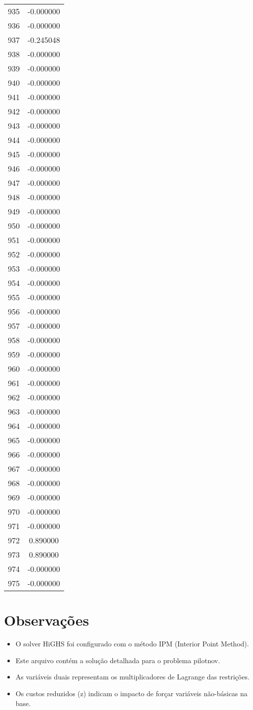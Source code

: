 \documentclass[12pt]{article}
\begin{document}
\begin{longtable}{@{}cc@{}}
935 & -0.000000 \\
936 & -0.000000 \\
937 & -0.245048 \\
938 & -0.000000 \\
939 & -0.000000 \\
940 & -0.000000 \\
941 & -0.000000 \\
942 & -0.000000 \\
943 & -0.000000 \\
944 & -0.000000 \\
945 & -0.000000 \\
946 & -0.000000 \\
947 & -0.000000 \\
948 & -0.000000 \\
949 & -0.000000 \\
950 & -0.000000 \\
951 & -0.000000 \\
952 & -0.000000 \\
953 & -0.000000 \\
954 & -0.000000 \\
955 & -0.000000 \\
956 & -0.000000 \\
957 & -0.000000 \\
958 & -0.000000 \\
959 & -0.000000 \\
960 & -0.000000 \\
961 & -0.000000 \\
962 & -0.000000 \\
963 & -0.000000 \\
964 & -0.000000 \\
965 & -0.000000 \\
966 & -0.000000 \\
967 & -0.000000 \\
968 & -0.000000 \\
969 & -0.000000 \\
970 & -0.000000 \\
971 & -0.000000 \\
972 & 0.890000 \\
973 & 0.890000 \\
974 & -0.000000 \\
975 & -0.000000 \\

\end{longtable}


\section{Observações}

\begin{itemize}
\item O solver HiGHS foi configurado com o método IPM (Interior Point Method).
\item Este arquivo contém a solução detalhada para o problema pilotnov.
\item As variáveis duais representam os multiplicadores de Lagrange das restrições.
\item Os custos reduzidos (z) indicam o impacto de forçar variáveis não-básicas na base.
\end{itemize}
\end{document}
